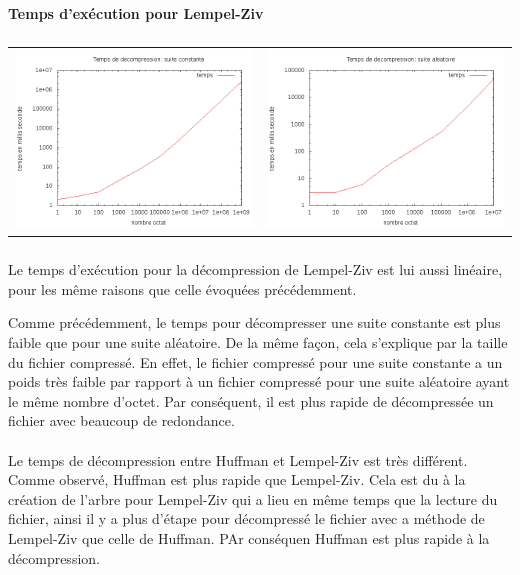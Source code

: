 \documentclass{report}
\begin{document}
\paragraph*{}
\textbf{Temps d’exécution pour Lempel-Ziv}
\subparagraph*{}
\hspace{-2cm}\begin{tabular}{l | l}
\includegraphics[width=7cm]{tempsDlzC.png} & 
\includegraphics[width=7cm]{tempsDlzA.png}
\end{tabular}
\subparagraph*{}

Le temps d'exécution pour la décompression de Lempel-Ziv est lui aussi linéaire, pour les même raisons que celle évoquées précédemment.

Comme précédemment, le temps pour décompresser une suite constante est plus faible que pour une suite aléatoire. De la même façon, cela s'explique par la taille du fichier compressé. En effet, le fichier compressé pour une suite constante a un poids très faible par rapport à un fichier compressé pour une suite aléatoire ayant le même nombre d'octet. Par conséquent, il est plus rapide de décompressée un fichier avec beaucoup de redondance.

\paragraph*{}
Le temps de décompression entre Huffman et Lempel-Ziv est très différent. Comme observé, Huffman est plus rapide que Lempel-Ziv. Cela est du à la création de l'arbre pour Lempel-Ziv qui a lieu en même temps que la lecture du fichier, ainsi il y a plus d'étape pour décompressé le fichier avec a méthode de Lempel-Ziv que celle de Huffman. PAr conséquen Huffman est plus rapide à la décompression.
\end{document}

